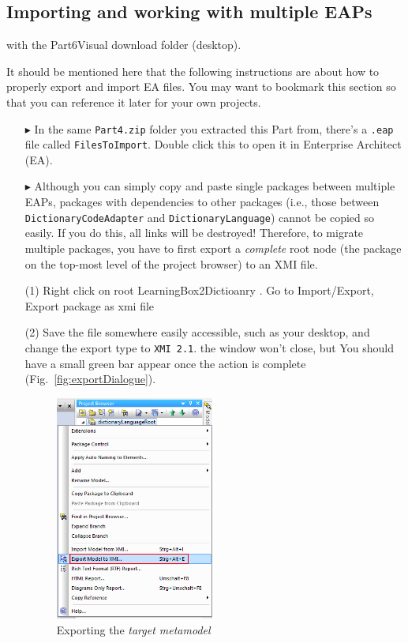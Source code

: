 \newpage
\subsection{Importing and working with multiple EAPs}
\visHeader
\label{sec:multiEAP}

\update with the Part6Visual download folder (desktop).

It should be mentioned here that the following instructions are about how to properly export and import EA files. You may want to bookmark this section so that
you can reference it later for your own projects.

\begin{itemize}

\item[$\blacktriangleright$] In the same \texttt{Part4.zip} folder you extracted this Part from, there's a \texttt{.eap} file called \texttt{FilesToImport}.
Double click this to open it in Enterprise Architect (EA).

\item[$\blacktriangleright$] Although you can simply copy and paste single packages between multiple EAPs, packages with dependencies to other packages (i.e.,
those between \texttt{DictionaryCodeAdapter} and \texttt{DictionaryLanguage}) cannot be copied so easily. If you do this, all links will be destroyed!
Therefore, to migrate multiple packages, you have to first export a \emph{complete} root node (the package on the top-most level of the project browser) to an
XMI file.

(1) Right click on root LearningBox2Dictioanry . Go to Import/Export, Export package as xmi file

(2) Save the file somewhere easily accessible, such as your desktop, and change the export type to \texttt{XMI 2.1}. the window won't close, but You should have
a small green bar appear once the action is complete (Fig.~\ref{fig:exportDialogue}).


\vspace{0.5cm}

\begin{figure}[htbp]
\begin{center}
  \includegraphics[width=0.5\textwidth]{ea_exportToXMI}
  \caption{Exporting the \emph{target metamodel}}
  \label{fig:export}
\end{center}
\end{figure}


\end{itemize}
